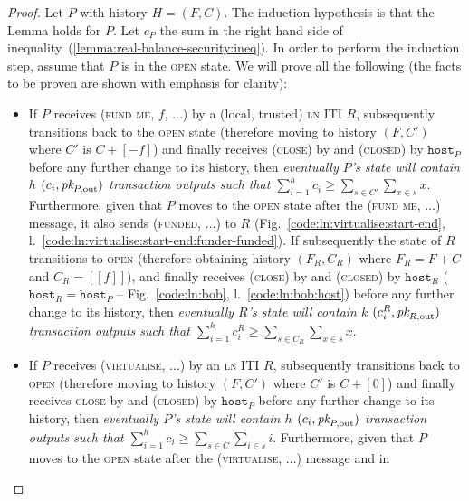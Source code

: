 \begin{proof}
  Let $P$ with history $H = (F, C)$. The induction hypothesis is that the Lemma
  holds for $P$. Let $c_P$ the sum in the right hand side of
  inequality~(\ref{lemma:real-balance-security:ineq}). In order to perform the
  induction step, assume that $P$ is in the \textsc{open} state. We will prove
  all the following (the facts to be proven are shown with emphasis for
  clarity):
  \begin{itemize}
    \item If $P$ receives (\textsc{fund me}, $f$, $\dots$) by a (local, trusted)
    \textsc{ln} ITI $R$, subsequently transitions back to the \textsc{open}
    state (therefore moving to history $(F, C')$ where $C'$ is $C + [-f]$) and
    finally receives (\textsc{close}) by \environment and (\textsc{closed}) by
    $\texttt{host}_P$ before any further change to its history, then
    \emph{eventually $P$'s \ledger state will contain $h$ $(c_i, \textit{pk}_{P,
    \mathrm{out}})$ transaction outputs such that $\sum\limits_{i=1}^h c_i \geq
    \sum\limits_{s \in C'} \sum\limits_{x \in s} x$}. Furthermore, given that
    $P$ moves to the \textsc{open} state after the (\textsc{fund me}, $\dots$)
    message, it also sends (\textsc{funded}, $\dots$) to $R$
    (Fig.~\ref{code:ln:virtualise:start-end},
    l.~\ref{code:ln:virtualise:start-end:funder-funded}). If subsequently the
    state of $R$ transitions to \textsc{open} (therefore obtaining history
    $(F_R, C_R)$ where $F_R = F + C$ and $C_R = [[f]]$), and finally receives
    (\textsc{close}) by \environment and (\textsc{closed}) by $\texttt{host}_R$
    ($\texttt{host}_R = \texttt{host}_P$ -- Fig.~\ref{code:ln:bob},
    l.~\ref{code:ln:bob:host}) before any further change to its history, then
    \emph{eventually $R$'s \ledger state will contain $k$ $(c^R_i, \textit{pk}_{R,
    \mathrm{out}})$ transaction outputs such that $\sum\limits_{i=1}^k c^R_i
    \geq \sum\limits_{s \in C_R} \sum\limits_{x \in s} x$}.
    \item If $P$ receives (\textsc{virtualise}, $\dots$) by an \textsc{ln} ITI
    $R$, subsequently transitions back to \textsc{open} (therefore moving to
    history $(F, C')$ where $C'$ is $C + [0]$) and finally receives
    \textsc{close} by \environment and (\textsc{closed}) by $\texttt{host}_P$
    before any further change to its history, then \emph{eventually $P$'s
    \ledger state will contain $h$ $(c_i, \textit{pk}_{P, \mathrm{out}})$ transaction
    outputs such that $\sum\limits_{i=1}^h c_i \geq \sum\limits_{s \in C}
    \sum\limits_{i \in s} i$}. Furthermore, given that $P$ moves to the
    \textsc{open} state after the (\textsc{virtualise}, $\dots$) message and in

\end{itemize}
\end{proof}
